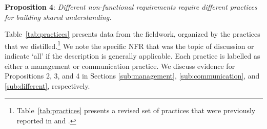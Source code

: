 \documentclass[smallextended]{svjour3}
\newcommand\cwproposition[2]{
\normalsize 
\vspace{0.5em}%
\noindent \textbf{\sffamily\fontsize{9}{11}\selectfont Proposition #1}: \textit{#2}
\vspace{0.5em}
}
\begin{document}
\cwproposition{4}{Different non-functional requirements require different practices for building shared understanding.}


\noindent Table~\ref{tab:practices} presents data from the fieldwork, organized by the practices that we distilled.\footnote{Table~\ref{tab:practices} presents a revised set of practices that were previously reported in \cite{werner2020re,werner_tse_2021} and \cite{okpara_re2022,okpara_rej2023}.} We note the specific NFR that was the topic of discussion or indicate `all' if the description is generally applicable. Each practice is labelled as either a management or communication practice.
We discuss evidence for Propositions 2, 3, and 4 in Sections \ref{sub:management}, \ref{sub:communication}, and \ref{sub:different}, respectively.
\end{document}
